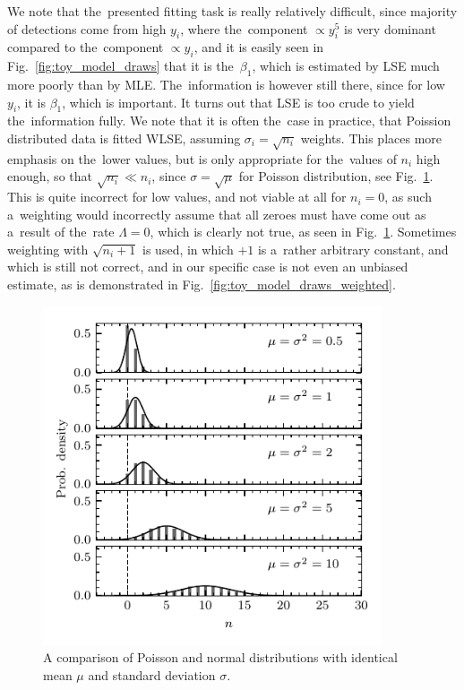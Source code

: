 We note that the~presented fitting task is really relatively difficult, since majority of detections come from high $y_i$, where the~component $\propto y_i^5$ is very dominant compared to the~component $\propto y_i$, and it is easily seen in Fig.~\ref{fig:toy_model_draws} that it is the~$\beta_1$, which is estimated by LSE much more poorly than by MLE. The~information is however still there, since for low $y_i$, it is $\beta_1$, which is important. It turns out that LSE is too crude to yield the~information fully. We note that it is often the~case in practice, that Poission distributed data is fitted WLSE, assuming $\sigma_i = \sqrt{n_i}$ weights. This places more emphasis on the~lower values, but is only appropriate for the~values of $n_i$ high enough, so that $\sqrt{n_i} \ll n_i$, since $\sigma = \sqrt{\mu}$ for Poisson distribution, see Fig.~\ref{fig:pois_vs_norm}. This is quite incorrect for low values, and not viable at all for $n_i = 0$, as such a~weighting would incorrectly assume that all zeroes must have come out as a~result of the~rate $\Lambda = 0$, which is clearly not true, as seen in Fig.~\ref{fig:pois_vs_norm}. Sometimes weighting with $\sqrt{n_i+1}$ is used, in which $+1$ is a~rather arbitrary constant, and which is still not correct, and in our specific case is not even an unbiased estimate, as is demonstrated in Fig.~\ref{fig:toy_model_draws_weighted}. 

\begin{figure}[ht]
 	\centering
 	\includegraphics[width=10cm]{figures/pois_vs_norm.pdf}
 	\caption{A comparison of Poisson and normal distributions with identical mean $\mu$ and standard deviation $\sigma$.}
 	\label{fig:pois_vs_norm}
\end{figure}

